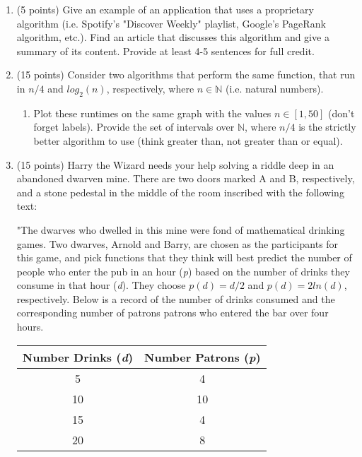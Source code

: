 \documentclass[12pt]{article}
\begin{document}
\begin{enumerate}


	\item	(5 points) Give an example of an application that uses a proprietary algorithm (i.e. Spotify's "Discover Weekly" playlist, Google's PageRank algorithm, etc.).  Find an article that discusses this algorithm and give a summary of its content.  Provide at least 4-5 sentences for full credit.

	\newpage

	\item (15 points) Consider two algorithms that perform the same function, that run in  $n/4$ and $log_{2}(n)$, respectively, where $n \in \mathbb{N}$ (i.e. natural numbers).

	\begin{enumerate}

	\item \label{stocks:a} Plot these runtimes on the same graph with the values $n \in [1,50]$ (don't forget labels). Provide the set of intervals over $\mathbb{N}$, where $n/4$ is the strictly better algorithm to use (think greater than, not greater than or equal).

	\end{enumerate}

	\newpage

	\item (15 points) Harry the Wizard needs your help solving a riddle deep in an abandoned dwarven mine. There are two doors marked A and B, respectively, and a stone pedestal in the middle of the room inscribed with the following text:

    \scriptsize

    "The dwarves who dwelled in  this mine were fond of mathematical drinking games. Two dwarves, Arnold and Barry, are chosen as the participants for this game, and pick functions that they think will best predict the number of people who enter the pub in an hour (\textit{p}) based on the number of drinks they consume in that hour (\textit{d}). They choose $p(d) = d/2$ and $p(d)= 2ln(d)$, respectively. Below is a record of the number of drinks consumed and the corresponding number of patrons patrons who entered the bar over four hours.

    \begin{center}
        \begin{tabular}{|c | c |}
        \hline
        Number Drinks (\textit{d}) & Number Patrons (\textit{p})\\ \hline
        5 & 4  \\ \hline
        10 & 10  \\ \hline
        15 & 4  \\ \hline
        20 & 8  \\ \hline


\end{tabular}
\end{center}
\end{enumerate}
\end{document}
